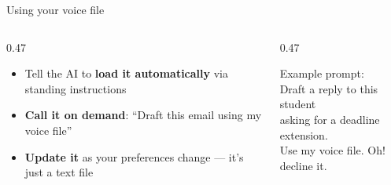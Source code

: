 \documentclass[aspectratio=169, 10pt]{beamer}
\begin{document}
\begin{frame}[fragile]{Using your voice file}
\begin{columns}[T]
\begin{column}{0.47\textwidth}
\begin{tcolorbox}[keybox, title={\faPen\quad Once the file exists}]
\small
\begin{itemize}\setlength{\itemsep}{2pt}
  \item Tell the AI to \textbf{load it automatically} via standing instructions
  \item \textbf{Call it on demand}: ``Draft this email using my voice file''
  \item \textbf{Update it} as your preferences change --- it's just a text file
\end{itemize}
\end{tcolorbox}
\end{column}
\begin{column}{0.47\textwidth}
\begin{tcolorbox}[colback=DarkSlate, colframe=DarkSlate, arc=3pt, left=6pt, right=6pt, top=4pt, bottom=4pt]
{\color{CoolGray}\ttfamily\tiny Example prompt:\\[2pt]
\color{white}\scriptsize
Draft a reply to this student\\
asking for a deadline extension.\\
Use my voice file. Oh! decline it.
}
\end{tcolorbox}
\end{column}
\end{columns}
\end{frame}

%
\end{document}
